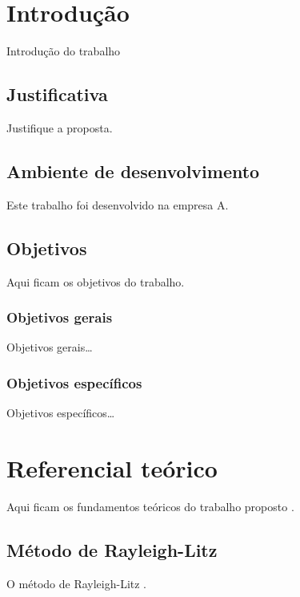 \documentclass[12pt,oneside,english,brazil,lmodern]{ucsmonograph}
\begin{document}
	\tableofcontents*
	
	\textual %
	
	\chapter{Introdução}
	Introdução do trabalho
	
	\section{Justificativa}
	Justifique a proposta.
	
	\section{Ambiente de desenvolvimento}
	Este trabalho foi desenvolvido na empresa A.
	
	\section{Objetivos}
	Aqui ficam os objetivos do trabalho.
	
	\subsection{Objetivos gerais}
	Objetivos gerais\dots
	
	\subsection{Objetivos específicos}
	Objetivos específicos\dots
	
	\chapter{Referencial teórico}
	Aqui ficam os fundamentos teóricos do trabalho proposto \cite{rao:2008}.
	
	\section{Método de Rayleigh-Litz}
	O método de Rayleigh-Litz \cite{cooley:1965}.
	
	\postextual
	
	
	
\end{document}

